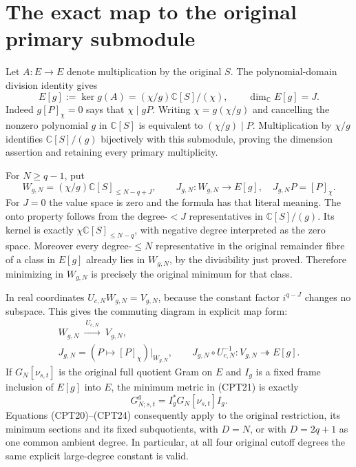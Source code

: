 \documentclass[11pt]{article}
\newcommand{\C}{\mathbb C}
\begin{document}
\section{The exact map to the original primary submodule}

Let \(A:E\to E\) denote multiplication by the original \(S\).
The polynomial-domain division identity gives
\begin{equation}\tag{CPT25}
 E[g]:=\ker g(A)=(\chi/g)\C[S]/(\chi),\qquad
 \dim_\C E[g]=J.
\end{equation}
Indeed \(g[P]_\chi=0\) says that \(\chi\mid gP\).
Writing \(\chi=g(\chi/g)\) and cancelling the nonzero polynomial
\(g\) in \(\C[S]\) is equivalent to \((\chi/g)\mid P\).
Multiplication by \(\chi/g\) identifies
\(\C[S]/(g)\) bijectively with this submodule, proving the
dimension assertion and retaining every primary multiplicity.

For \(N\ge q-1\), put
\[
 W_{g,N}=(\chi/g)\C[S]_{\le N-q+J},\qquad
 J_{g,N}:W_{g,N}\longrightarrow E[g],\quad
 J_{g,N}P=[P]_\chi.
\]
For \(J=0\) the value space is zero and the formula has that
literal meaning.  The onto property follows from the
degree-\(<J\) representatives in \(\C[S]/(g)\).
Its kernel is exactly \(\chi\C[S]_{\le N-q}\), with negative
degree interpreted as the zero space.  Moreover every
degree-\(\le N\) representative in the original remainder fibre
of a class in \(E[g]\) already lies in \(W_{g,N}\), by the
divisibility just proved.  Therefore minimizing in \(W_{g,N}\)
is precisely the original minimum for that class.

In real coordinates \(U_{c,N}W_{g,N}=V_{g,N}\), because the
constant factor \(i^{q-J}\) changes no subspace.  This gives the
commuting diagram in explicit map form:
\begin{equation}\tag{CPT26}
\begin{gathered}
 W_{g,N}\ \xrightarrow{\ U_{c,N}\ }\ V_{g,N},\\
 J_{g,N}
 =\left(P\longmapsto[P]_\chi\right)\big|_{W_{g,N}},
 \qquad
 J_{g,N}\circ U_{c,N}^{-1}:V_{g,N}\twoheadrightarrow E[g].
\end{gathered}
\end{equation}
If \(G_N[\nu_{s,t}]\) is the original full quotient Gram on \(E\)
and \(I_g\) is a fixed frame inclusion of \(E[g]\) into \(E\),
the minimum metric in (CPT21) is exactly
\begin{equation}\tag{CPT27}
 G^{g}_{N;s,t}=I_g^*G_N[\nu_{s,t}]I_g.
\end{equation}
Equations (CPT20)--(CPT24) consequently apply to the original
restriction, its minimum sections and its fixed subquotients,
with \(D=N\), or with \(D=2q+1\) as one common ambient degree.
In particular, at all four original cutoff degrees the same
explicit large-degree constant is valid.
\end{document}
